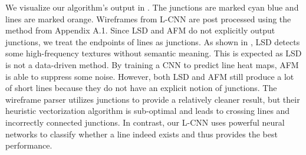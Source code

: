 \documentclass[10pt,twocolumn,letterpaper]{article}
\newcommand{\N}[1]{{\color{red}{#1}}}
\renewcommand{\N}[1]{{{#1}}}
\begin{document}
We visualize our algorithm's output in . The junctions are marked cyan blue and lines are marked orange.  Wireframes from L-CNN are post processed using the method from \N{Appendix A.1}.  Since LSD and AFM do not explicitly output junctions, we treat the endpoints of lines as junctions. As shown in , LSD detects some high-frequency textures without semantic meaning.  This is expected as LSD is not a data-driven method.  By training a CNN to predict line heat maps, AFM \cite{xue2018learning} is able to suppress some noise.  However, both LSD and AFM still produce a lot of short lines because they do not have an explicit notion of junctions.  The wireframe parser \cite{Huang:2018:LPW} utilizes junctions to provide a relatively cleaner result, but their heuristic vectorization algorithm is sub-optimal and leads to crossing lines and incorrectly connected junctions. In contrast, our L-CNN uses powerful neural networks to classify whether a line indeed exists and thus provides the best performance.
\end{document}

